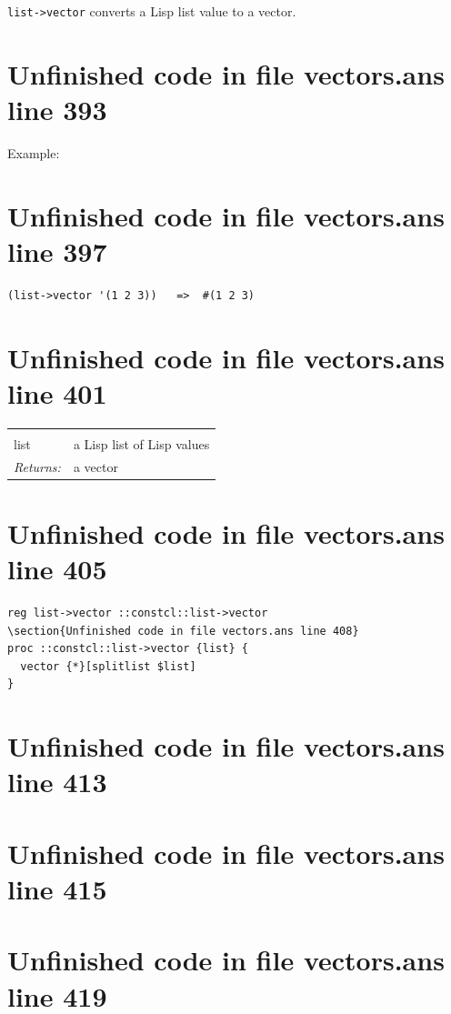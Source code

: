 \documentclass[twoside,9pt]{report}
\begin{document}
\texttt{list->vector} converts a Lisp list value to a vector.

\section{Unfinished code in file vectors.ans line 393}


Example:

\section{Unfinished code in file vectors.ans line 397}
\begin{verbatim}
(list->vector '(1 2 3))   =>  #(1 2 3)
\end{verbatim}
\section{Unfinished code in file vectors.ans line 401}
\noindent\begin{tabular}{ |p{1.9cm} p{8cm}| }
\hline
\rowcolor[HTML]{CCCCCC} \multicolumn{2}{|l|}{\bf list->vector (public)} \\
list & a Lisp list of Lisp values \\
\textit{Returns:} & a vector \\
\hline
\end{tabular}
\section{Unfinished code in file vectors.ans line 405}
\begin{lstlisting}
reg list->vector ::constcl::list->vector
\section{Unfinished code in file vectors.ans line 408}
proc ::constcl::list->vector {list} {
  vector {*}[splitlist $list]
}
\end{lstlisting}
\section{Unfinished code in file vectors.ans line 413}
\section{Unfinished code in file vectors.ans line 415}
\section{Unfinished code in file vectors.ans line 419}
\end{document}
